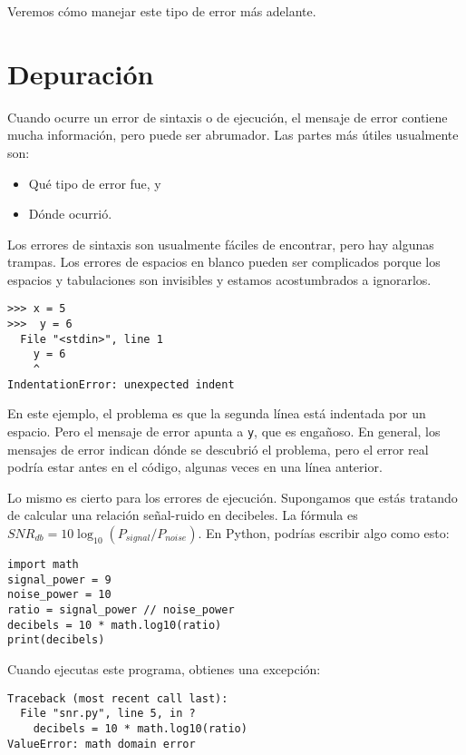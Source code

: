 Veremos cómo manejar este tipo de error más adelante.

\section{Depuración}

Cuando ocurre un error de sintaxis o de ejecución, el mensaje de error contiene mucha información, pero puede ser abrumador. Las partes más útiles usualmente son:

\begin{itemize}
\item Qué tipo de error fue, y
\item Dónde ocurrió.
\end{itemize}

Los errores de sintaxis son usualmente fáciles de encontrar, pero hay algunas trampas. Los errores de espacios en blanco pueden ser complicados porque los espacios y tabulaciones son invisibles y estamos acostumbrados a ignorarlos.

\begin{verbatim}
>>> x = 5
>>>  y = 6
  File "<stdin>", line 1
    y = 6
    ^
IndentationError: unexpected indent
\end{verbatim}

En este ejemplo, el problema es que la segunda línea está indentada por un espacio. Pero el mensaje de error apunta a \texttt{y}, que es engañoso. En general, los mensajes de error indican dónde se descubrió el problema, pero el error real podría estar antes en el código, algunas veces en una línea anterior.

Lo mismo es cierto para los errores de ejecución. Supongamos que estás tratando de calcular una relación señal-ruido en decibeles. La fórmula es $SNR_{db} = 10 \log_{10}(P_{signal}/P_{noise})$. En Python, podrías escribir algo como esto:

\begin{verbatim}
import math
signal_power = 9
noise_power = 10
ratio = signal_power // noise_power
decibels = 10 * math.log10(ratio)
print(decibels)
\end{verbatim}

Cuando ejecutas este programa, obtienes una excepción:

\begin{verbatim}
Traceback (most recent call last):
  File "snr.py", line 5, in ?
    decibels = 10 * math.log10(ratio)
ValueError: math domain error
\end{verbatim}

